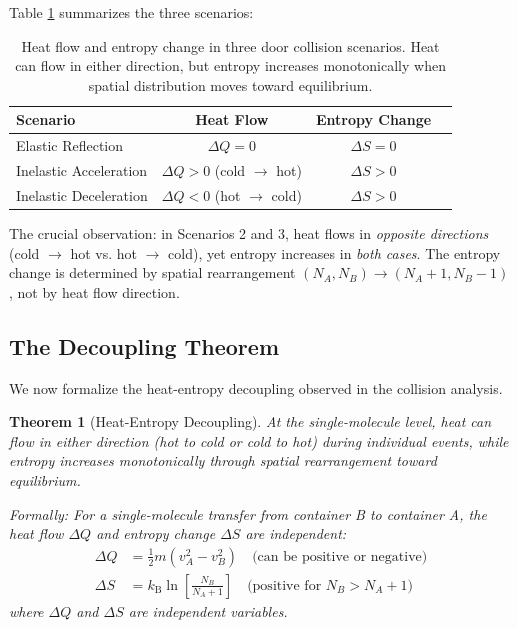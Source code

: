 \documentclass[10pt,twocolumn,letterpaper]{article}
\newtheorem{theorem}{Theorem}[section]
\theoremstyle{definition}
\theoremstyle{remark}
\newcommand{\kb}{k_\text{B}}
\begin{document}
Table \ref{tab:heat_entropy_decoupling} summarizes the three scenarios:

\begin{table}[h]
\centering
\caption{Heat flow and entropy change in three door collision scenarios. Heat can flow in either direction, but entropy increases monotonically when spatial distribution moves toward equilibrium.}
\label{tab:heat_entropy_decoupling}
\begin{tabular}{lccc}
\toprule
\textbf{Scenario} & \textbf{Heat Flow} & \textbf{Entropy Change} \\
\midrule
Elastic Reflection & $\Delta Q = 0$ & $\Delta S = 0$ \\
Inelastic Acceleration  & $\Delta Q > 0$ (cold $\to$ hot) & $\Delta S > 0$ \\
Inelastic Deceleration  & $\Delta Q < 0$ (hot $\to$ cold) & $\Delta S > 0$ \\
\bottomrule
\end{tabular}
\end{table}

The crucial observation: in Scenarios 2 and 3, heat flows in \textit{opposite directions} (cold $\to$ hot vs. hot $\to$ cold), yet entropy increases in \textit{both cases}. The entropy change is determined by spatial rearrangement $(N_A, N_B) \to (N_A+1, N_B-1)$, not by heat flow direction.

\subsection{The Decoupling Theorem}

We now formalize the heat-entropy decoupling observed in the collision analysis.

\begin{theorem}[Heat-Entropy Decoupling]
\label{thm:decoupling}
At the single-molecule level, heat can flow in either direction (hot to cold or cold to hot) during individual events, while entropy increases monotonically through spatial rearrangement toward equilibrium.

Formally: For a single-molecule transfer from container B to container A, the heat flow $\Delta Q$ and entropy change $\Delta S$ are independent:
\begin{align}
\Delta Q &= \frac{1}{2}m(v_A^2 - v_B^2) \quad \text{(can be positive or negative)} \\
\Delta S &= \kb \ln\left[\frac{N_B}{N_A+1}\right] \quad \text{(positive for } N_B > N_A + 1\text{)}
\end{align}
where $\Delta Q$ and $\Delta S$ are independent variables.
\end{theorem}
\end{document}
